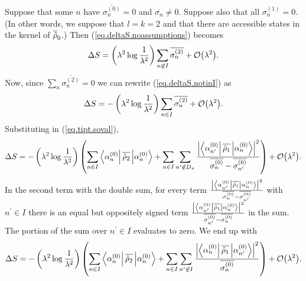 Suppose that some \(n\) have \(\overline{\sigma_n^{(0)}} = 0\) and \(\overline{\sigma_n} \neq 0\). Suppose also that all \(\sigma_n^{(1)} = 0\). (In other words, we suppose that \(l=k=2\) and that there are accessible states in the kernel of \(\overline{\hat{\rho}}_0\).) Then  (\ref{eq.deltaS.noassumptions}) becomes
\begin{equation}\label{eq.deltaS.notinI}
\Delta S = \left(\lambda^2\log\frac{1}{\lambda^{2}} \right)\sum_{n \not\in I} \overline{\sigma_n^{(2)}} + \mathcal{O}{\left(\lambda^2\right)}.
\end{equation}
Now, since \(\sum_{n} \overline{\sigma_n^{(2)}}= 0\) we can rewrite (\ref{eq.deltaS.notinI}) as
\begin{equation}\label{eq.deltaS}
\Delta S = -\left(\lambda^2\log\frac{1}{\lambda^{2}} \right)\sum_{n \in I} \overline{\sigma_n^{(2)}} + \mathcal{O}{\left(\lambda^2\right)}.
\end{equation}
Substituting in (\ref{eq.tipt.soval}),
\[
\Delta S = -\left(\lambda^2 \log\frac{1}{\lambda^2}\right)\left(\sum_{n \in I} \left\langle\alpha_n^{(0)}\right|\overline{\hat{\rho}_2}\left|\alpha_n^{(0)}\right\rangle +  \sum_{n \in I} \sum_{{n^\prime} \not\in D_n} \frac{\left|\left\langle\alpha_{n^\prime}^{(0)}\right| \overline{\hat{\rho}_1} \left|\alpha_n^{(0)}\right\rangle\right|^2}{\overline{\sigma_n^{(0)}}-\overline{\sigma_{n^\prime}^{(0)}}} \right)+ \mathcal{O}{\left(\lambda^2\right)}.
\]
In the second term with the double sum, for every term \(\frac{\left|\left\langle\alpha_{n^\prime}^{(0)}\right| \overline{\hat{\rho}_1} \left|\alpha_n^{(0)}\right\rangle\right|^2}{\overline{\sigma_n^{(0)}}-\overline{\sigma_{n^\prime}^{(0)}}}\) with \(n^\prime \in I\) there is an equal but oppositely signed term \(\frac{\left|\left\langle\alpha_{n^\prime}^{(0)}\right| \overline{\hat{\rho}_1} \left|\alpha_n^{(0)}\right\rangle\right|^2}{\overline{\sigma_{n^\prime}^{(0)}}-\overline{\sigma_n^{(0)}}}\) in the sum. The portion of the sum over \(n^\prime \in I\) evaluates to zero. We end up with
\begin{equation}\label{eq.deltaSso.intermediate}
\Delta S = -\left(\lambda^2 \log\frac{1}{\lambda^2}\right)\left(\sum_{n \in I} \left\langle\alpha_n^{(0)}\right|\overline{\hat{\rho}_2}\left|\alpha_n^{(0)}\right\rangle +  \sum_{n \in I} \sum_{n^\prime \not\in I} \frac{\left|\left\langle\alpha_{n}^{(0)}\right| \overline{\hat{\rho}_1} \left|\alpha_{n^\prime}^{(0)}\right\rangle\right|^2}{\overline{\sigma_n^{(0)}}} \right)+ \mathcal{O}{\left(\lambda^2\right)}.
\end{equation}


